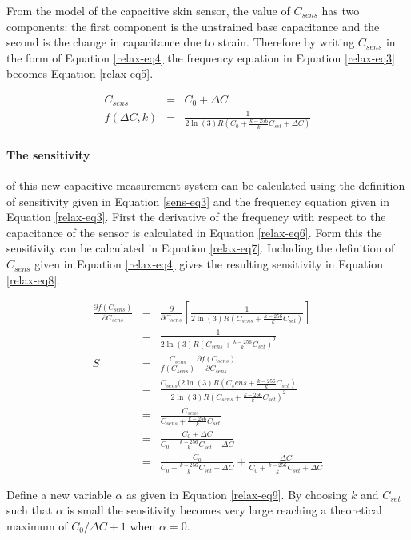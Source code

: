 From the model of the capacitive skin sensor, the value of $C_{sens}$ has two components: the first component is the unstrained base capacitance and the second is the change in capacitance due to strain.  Therefore by writing $C_{sens}$ in the form of Equation \ref{relax-eq4} the frequency equation in Equation \ref{relax-eq3} becomes Equation \ref{relax-eq5}.

\begin{eqnarray}
	C_{sens}&=&C_0+\Delta C\label{relax-eq4}\\
	f(\Delta C,k)&=&\frac{1}{2\ln(3)R(C_0+\frac{k-256}{k}C_{set}+\Delta C)}\label{relax-eq5}	
\end{eqnarray}

\paragraph{The sensitivity} of this new capacitive measurement system can be calculated using the definition of sensitivity given in Equation \ref{sens-eq3} and the frequency equation given in Equation \ref{relax-eq3}.  First the derivative of the frequency with respect to the capacitance of the sensor is calculated in Equation \ref{relax-eq6}.  Form this the sensitivity can be calculated in Equation \ref{relax-eq7}.  Including the definition of $C_{sens}$ given in Equation \ref{relax-eq4} gives the resulting sensitivity in Equation \ref{relax-eq8}.

\begin{eqnarray}
	\frac{\partial f(C_{sens})}{\partial C_{sens}}&=&\frac{\partial}{\partial C_{sens}}\left[\frac{1}{2\ln(3)R(C_{sens}+\frac{k-256}{k}C_{set})}\right]\\
	&=&\frac{1}{2\ln(3)R(C_{sens}+\frac{k-256}{k}C_{set})^2}\label{relax-eq6}\\
	S&=&\frac{C_{sens}}{f(C_{sens})}\frac{\partial f(C_{sens})}{\partial C_{sens}}\\
	&=&\frac{C_{sens}(2\ln(3)R(C_sens+\frac{k-256}{k}C_{set})}{2\ln(3)R(C_{sens}+\frac{k-256}{k}C_{set})^2}\\
	&=&\frac{C_{sens}}{C_{sens}+\frac{k-256}{k}C_{set}}\label{relax-eq7}\\
	&=&\frac{C_0+\Delta C}{C_0+\frac{k-256}{k}C_{set}+\Delta C}\\
	&=&\frac{C_0}{C_0+\frac{k-256}{k}C_{set}+\Delta C}+\frac{\Delta C}{C_0+\frac{k-256}{k}C_{set}+\Delta C}\label{relax-eq8}
\end{eqnarray}

Define a new variable $\alpha$ as given in Equation \ref{relax-eq9}.  By choosing $k$ and $C_{set}$ such that $\alpha$ is small the sensitivity becomes very large reaching a theoretical maximum of $C_0/\Delta C+1$ when $\alpha=0$.

